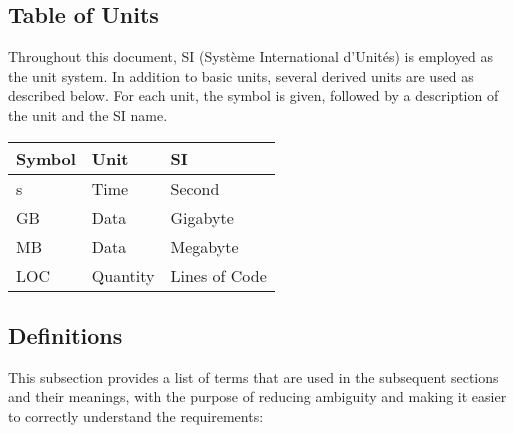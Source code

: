 \documentclass[12pt, titlepage]{article}
\begin{document}
\subsection{Table of Units}

Throughout this document, SI (Système International d'Unités) is employed as the unit system. In addition to basic units, several derived units are used as described below. For each unit, the symbol is given, followed by a description of the unit and the SI name.

\renewcommand{\arraystretch}{1.2}
\noindent \begin{tabular}{l l l} 
    \toprule		
    \textbf{Symbol} & \textbf{Unit} & \textbf{SI}\\
    \midrule 
    \si{\second} & Time & Second\\
    \si{GB} & Data & Gigabyte\\
    \si{MB} & Data & Megabyte\\
    \si{LOC} & Quantity & Lines of Code\\
    \bottomrule
\end{tabular}

\subsection{Definitions}
This subsection provides a list of terms that are used in the subsequent sections and their meanings, with the purpose of reducing ambiguity and making it easier to correctly understand the requirements:
\end{document}
